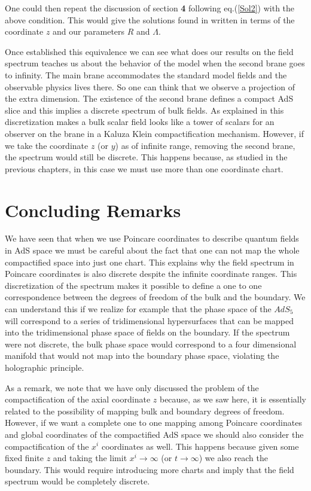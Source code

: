 \documentclass[a4paper,12pt]{article}
\begin{document}
\noindent  One could then repeat the discussion of section {\bf 4} 
following eq.(\ref{Sol2}) with the above condition. This would give 
the solutions found in \cite{GW1} written in terms of the coordinate 
$z$ and our parameters $R$ and $\Lambda$.

Once established this equivalence we can see what does our results  
on the field spectrum teaches us about the behavior of the model
when the second brane goes to infinity. 
The main brane accommodates the standard 
model fields and the observable physics lives there.
So one can think that we observe a projection of the extra dimension.
The existence of the second 
brane defines a compact AdS slice and this implies a discrete 
spectrum of bulk fields. As explained in \cite{GW1} this discretization 
makes a bulk scalar field looks like a tower of scalars for an observer on
the brane in a Kaluza Klein compactification mechanism. However,
if we take the coordinate $z$ (or $y$) as of
infinite range, removing the second brane, the spectrum would still 
be discrete.
This happens because, as studied in the previous
chapters, in this case we must use more than one coordinate chart.

  
 
\section{Concluding Remarks}

We have seen that when we use Poincare coordinates to describe 
quantum fields in AdS space we must be careful about the fact that
one can not map the whole compactified space into just one chart.
This explains why the field spectrum in Poincare coordinates is also 
discrete despite the infinite coordinate ranges.
This discretization of the spectrum makes it possible 
to define a one to one correspondence between the degrees of 
freedom of the bulk and the boundary. 
We can understand this if we realize for example that the phase space
of the $AdS_5$  will correspond to a series of tridimensional hypersurfaces
that can be mapped into the tridimensional phase space of fields on 
the boundary.
If the spectrum were not discrete, the bulk phase space would correspond
 to a four dimensional manifold that would not map into the boundary 
phase space, violating the holographic principle.


As a remark, we note that we have only discussed the problem of 
the compactification of the axial coordinate $z$ because, as we saw here, 
it is essentially 
related to the possibility of mapping bulk and boundary degrees of freedom.
However, if we want a complete one to one mapping among Poincare coordinates 
and global coordinates of the compactified AdS space we should also consider
the compactification of the $x^i$ coordinates as well.
This happens because given some fixed finite $z$ and taking the limit 
$x^i \rightarrow \infty $  (or $ t \rightarrow \infty $) 
we also reach the boundary. 
This would require introducing more charts and imply that the 
field spectrum would be completely discrete.
\end{document}
